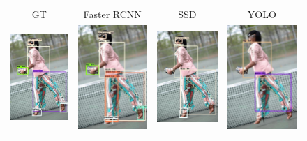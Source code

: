 \begin{figure}[H]
	\centering
	\setlength{\tabcolsep}{0.5pt}
	\setlength{\fboxsep}{0pt}%
	\setlength{\fboxrule}{0.1pt}%
	\renewcommand{\arraystretch}{0.6}
	\begin{tabular}{cccc}
		GT & Faster RCNN & SSD & YOLO \\
		\includegraphics[width=.11\textwidth]{./figures/detection/0111624_0_5_gt_b.jpg} & 
		\includegraphics[width=.11\textwidth]{./figures/detection/faster_0111624_0_5_det_b.jpg} &
		\includegraphics[width=.11\textwidth]{./figures/detection/ssd_0111624_0_5_det_b.jpg} &
		\includegraphics[width=.11\textwidth]{./figures/detection/yolo_0111624_0_5_det_b.jpg}\\
		

\end{tabular}
\end{figure}
